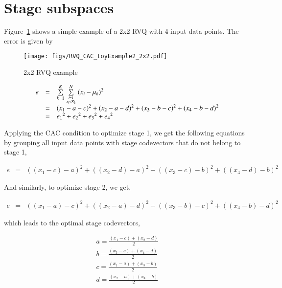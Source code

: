 \documentclass[12pt,letterpaper,doublespaced,ETD]{gt-ece-thesis}
\begin{document}
\section{Stage subspaces}
Figure~\ref{fig:Figure1} shows a simple example of a 2x2 RVQ with 4 input data points.  The error is given by

\begin{figure}
\center
\texttt{[image: figs/RVQ\_CAC\_toyExample2\_2x2.pdf]}
\caption{2x2 RVQ example}
\label{fig:Figure1}
\end{figure}

\begin{equation}
\begin{array}{lllll}
e &=& \sum\limits_{k=1}^K \sum\limits_{{i=1 \atop x_i \in \mathcal{K}_k}}^N {(x_i - \mu_k)}^2 \\
&=& {(x_1 - a - c)}^2 + {(x_2- a - d)}^2 + {(x_3 - b - c)}^2 + {(x_4 - b - d)}^2\\
&=& {e_1}^2 + {e_2}^2 + {e_3}^2 + {e_4}^2
\end{array}
\end{equation}

Applying the CAC condition to optimize stage 1, we get the following equations by grouping all input data points with stage codevectors that do not belong to stage 1,

\begin{equation}
\begin{array}{lllll}
e &=& {((x_1 - c) - a)}^2 + {((x_2- d) - a)}^2 + {((x_3 - c) - b)}^2 + {((x_4 - d) - b)}^2
\end{array}
\label{Eqn:2x2RVQ_stage1}
\end{equation}

And similarly, to optimize stage 2, we get,

\begin{equation}
\begin{array}{lllll}
e &=& {((x_1 - a) - c)}^2 + {((x_2- a) - d)}^2 + {((x_3 - b) - c)}^2 + {((x_4 - b) - d)}^2
\end{array}
\label{Eqn:2x2RVQ_stage2}
\end{equation}

which leads to the optimal stage codevectors,

\begin{equation}
\begin{array}{lllll}
a = \frac{(x_1 - c) + (x_2 - d)}{2}\\
b = \frac{(x_3 - c) + (x_4 - d)}{2}\\
c = \frac{(x_1 - a) + (x_3 - b)}{2}\\
d = \frac{(x_2 - a) + (x_4 - b)}{2}\\
\end{array}
\end{equation}
\end{document}
